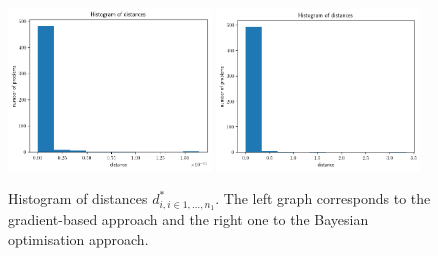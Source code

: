 \begin{figure}[h]
    \begin{center}
      \includegraphics[width=0.48\textwidth]{./Thesis/images/chapter4/ex2D_distance_hist.png}
      \includegraphics[width=0.48\textwidth]{./Thesis/images/chapter4/ex2D_distance_hist_bo.png}
    \end{center}
    \caption{Histogram of distances $d_{i, i \in {1, \ldots,
          n_1}}^*$. The left graph corresponds to the gradient-based
      approach and the right one to the Bayesian optimisation
      approach.}
  \label{fig:ex2_1}
\end{figure}


